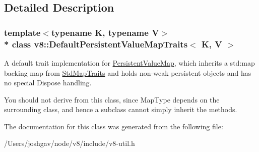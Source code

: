 \subsection{Detailed Description}
\subsubsection*{template$<$typename K, typename V$>$\\*
class v8\+::\+Default\+Persistent\+Value\+Map\+Traits$<$ K, V $>$}

A default trait implementation for \hyperlink{classv8_1_1_persistent_value_map}{Persistent\+Value\+Map}, which inherits a std\+:map backing map from \hyperlink{classv8_1_1_std_map_traits}{Std\+Map\+Traits} and holds non-\/weak persistent objects and has no special Dispose handling.

You should not derive from this class, since Map\+Type depends on the surrounding class, and hence a subclass cannot simply inherit the methods. 

The documentation for this class was generated from the following file\+:\begin{DoxyCompactItemize}
\item 
/\+Users/joshgav/node/v8/include/v8-\/util.\+h\end{DoxyCompactItemize}
